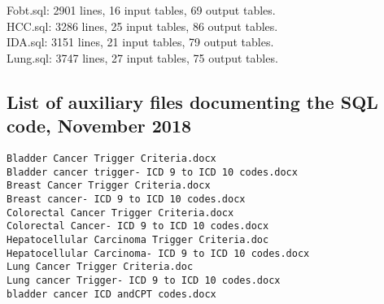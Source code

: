 \documentclass{article}
\begin{document}
Fobt.sql: 2901 lines, 16 input tables, 69 output tables.  \\
HCC.sql: 3286 lines, 25 input tables, 86 output tables.  \\
IDA.sql: 3151 lines, 21 input tables, 79 output tables.  \\
Lung.sql: 3747 lines, 27 input tables, 75 output tables.  \\

\subsection{List of auxiliary files documenting the SQL code, November 2018}

\begin{verbatim}
Bladder Cancer Trigger Criteria.docx
Bladder cancer trigger- ICD 9 to ICD 10 codes.docx
Breast Cancer Trigger Criteria.docx
Breast cancer- ICD 9 to ICD 10 codes.docx
Colorectal Cancer Trigger Criteria.docx
Colorectal Cancer- ICD 9 to ICD 10 codes.docx
Hepatocellular Carcinoma Trigger Criteria.doc
Hepatocellular Carcinoma- ICD 9 to ICD 10 codes.docx
Lung Cancer Trigger Criteria.doc
Lung cancer Trigger- ICD 9 to ICD 10 codes.docx
bladder cancer ICD andCPT codes.docx
\end{verbatim}
\end{document}
